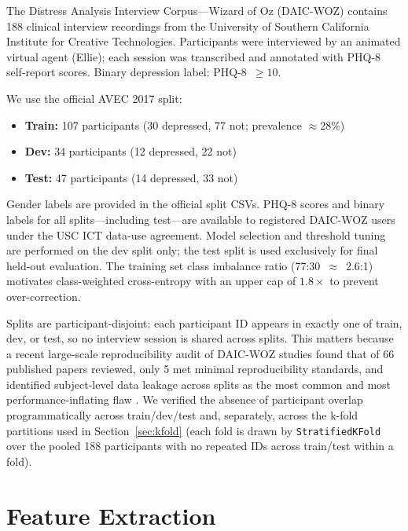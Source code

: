 \documentclass[journal]{IEEEtran}
\begin{document}
The Distress Analysis Interview Corpus---Wizard of Oz (DAIC-WOZ)
\cite{gratch2014} contains 188 clinical interview recordings from
the University of Southern California Institute for Creative
Technologies. Participants were interviewed
by an animated virtual agent (Ellie); each session was transcribed
and annotated with PHQ-8 self-report scores. Binary depression label:
PHQ-8~$\geq 10$.

We use the official AVEC 2017 split:
\begin{itemize}
  \item \textbf{Train:} 107 participants (30 depressed, 77 not;
    prevalence $\approx28\%$)
  \item \textbf{Dev:} 34 participants (12 depressed, 22 not)
  \item \textbf{Test:} 47 participants (14 depressed, 33 not)
\end{itemize}

Gender labels are provided in the official split CSVs. PHQ-8 scores
and binary labels for all splits---including test---are available to
registered DAIC-WOZ users under the USC ICT data-use agreement.
Model selection and threshold tuning are performed on the dev split
only; the test split is used exclusively for final held-out evaluation.
The training set class
imbalance ratio (77:30~$\approx$~2.6:1) motivates class-weighted
cross-entropy with an upper cap of $1.8\times$ to prevent over-correction.

Splits are participant-disjoint: each participant ID appears in
exactly one of train, dev, or test, so no interview session is
shared across splits. This matters because a recent large-scale
reproducibility audit of DAIC-WOZ studies found that of 66 published
papers reviewed, only 5 met minimal reproducibility standards, and
identified subject-level data leakage across splits as the most
common and most performance-inflating flaw \cite{danylenko2026}. We
verified the absence of participant overlap programmatically across
train/dev/test and, separately, across the k-fold partitions used
in Section~\ref{sec:kfold} (each fold is drawn by \texttt{StratifiedKFold}
over the pooled 188 participants with no repeated IDs across
train/test within a fold).

\section{Feature Extraction}
\label{sec:features}
\end{document}
